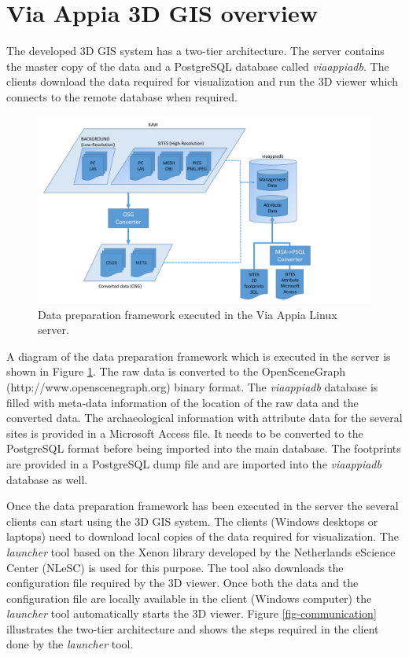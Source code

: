 \documentclass[a4paper,11pt]{article}
\begin{document}
\section{Via Appia 3D GIS overview}
\label{sec:overview}
The developed 3D GIS system has a two-tier architecture. The server contains the master copy of the data and a PostgreSQL database called \textit{viaappiadb}. The clients download the data required for visualization and run the 3D viewer which connects to the remote database when required.

\begin{figure}[!ht]
\centering
\includegraphics[scale=0.5]{fig/server_diagram.pdf}
\caption{Data preparation framework executed in the Via Appia Linux server.}
\label{fig-serverdiagram}
\end{figure}

A diagram of the data preparation framework which is executed in the server is shown in Figure \ref{fig-serverdiagram}. The raw data is converted to the OpenSceneGraph (http://www.openscenegraph.org) binary format. The \textit{viaappiadb} database is filled with meta-data information of the location of the raw data and the converted data. The archaeological information with attribute data for the several sites is provided in a Microsoft Access file. It needs to be converted to the PostgreSQL format before being imported into the main database. The footprints are provided in a PostgreSQL dump file and are imported into the \textit{viaappiadb} database as well.

Once the data preparation framework has been executed in the server the several clients can start using the 3D GIS system. The clients (Windows desktops or laptops) need to download local copies of the data required for visualization. The \textit{launcher} tool based on the Xenon library developed by the Netherlands eScience Center (NLeSC) is used for this purpose. The tool also downloads the configuration file required by the 3D viewer. Once both the data and the configuration file are locally available in the client (Windows computer) the \textit{launcher} tool automatically starts the 3D viewer. Figure  \ref{fig-communication} illustrates the two-tier architecture and shows the steps required in the client done by the \textit{launcher} tool. 
\end{document}
